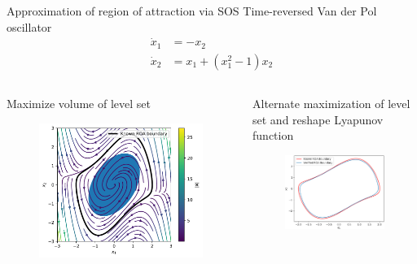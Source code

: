 \documentclass[aspectratio=169]{beamer}
\begin{document}
\begin{frame}{Approximation of region of attraction via SOS
\href{https://colab.research.google.com/github/RussTedrake/underactuated/blob/master/examples/lyapunov.ipynb}{}}
Time-reversed Van der Pol oscillator
\begin{align*}
\dot x_1 &= - x_2 \\
\dot x_2 &= x_1 + (x_1^2 - 1) x_2
\end{align*}
\vspace{-5mm}
\begin{columns}
\begin{block}{Maximize volume of level set}
\begin{figure}
\includegraphics[width=.6\columnwidth]{figures/van_der_pol_roa_quadratic.pdf}
\end{figure}
\end{block}
\begin{block}{Alternate maximization of level set and reshape Lyapunov function}
\begin{figure}
\includegraphics[width=.7\columnwidth]{figures/van_der_pol_roa.png}
\end{figure}
\end{block}
\end{columns}
\end{frame}
\end{document}
